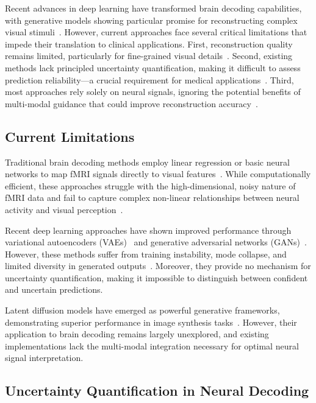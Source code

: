 Recent advances in deep learning have transformed brain decoding capabilities, with generative models showing particular promise for reconstructing complex visual stimuli~\cite{shen2019deep,ozcelik2022natural}. However, current approaches face several critical limitations that impede their translation to clinical applications. First, reconstruction quality remains limited, particularly for fine-grained visual details~\cite{lin2019neural}. Second, existing methods lack principled uncertainty quantification, making it difficult to assess prediction reliability—a crucial requirement for medical applications~\cite{begoli2019need}. Third, most approaches rely solely on neural signals, ignoring the potential benefits of multi-modal guidance that could improve reconstruction accuracy~\cite{chen2023seeing}.

\subsection{Current Limitations}

Traditional brain decoding methods employ linear regression or basic neural networks to map fMRI signals directly to visual features~\cite{naselaris2009bayesian,nishimoto2011reconstructing}. While computationally efficient, these approaches struggle with the high-dimensional, noisy nature of fMRI data and fail to capture complex non-linear relationships between neural activity and visual perception~\cite{st2014feature}.

Recent deep learning approaches have shown improved performance through variational autoencoders (VAEs)~\cite{du2017visual} and generative adversarial networks (GANs)~\cite{seeliger2018generative}. However, these methods suffer from training instability, mode collapse, and limited diversity in generated outputs~\cite{arjovsky2017wasserstein}. Moreover, they provide no mechanism for uncertainty quantification, making it impossible to distinguish between confident and uncertain predictions.

Latent diffusion models have emerged as powerful generative frameworks, demonstrating superior performance in image synthesis tasks~\cite{rombach2022high}. However, their application to brain decoding remains largely unexplored, and existing implementations lack the multi-modal integration necessary for optimal neural signal interpretation.

\subsection{Uncertainty Quantification in Neural Decoding}

